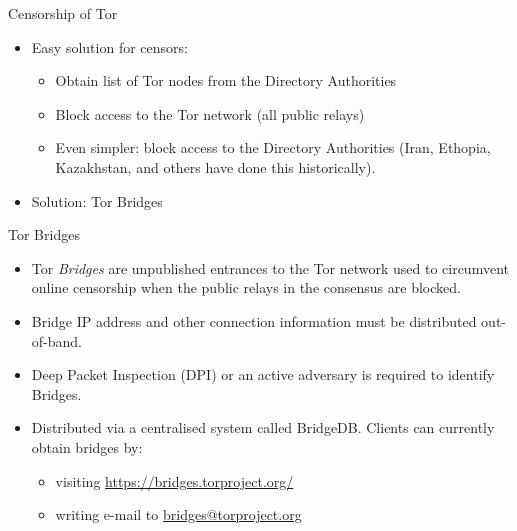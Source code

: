 \documentclass[9pt,a4paper]{beamer}
\begin{document}
\begin{frame}{Censorship of Tor}
  \begin{itemize}
    \item Easy solution for censors: 
      \begin{itemize}
        \item<2-> Obtain list of Tor nodes from the Directory Authorities
        \item<3-> Block access to the Tor network (all public relays)
        \item<4-> Even simpler: block access to the Directory Authorities (Iran, Ethopia, Kazakhstan,
          and others have done this historically).
      \end{itemize}
    \item<5-> Solution: Tor Bridges
  \end{itemize}
\end{frame}


\begin{frame}{Tor Bridges}
  \begin{itemize}
    \item<1-> Tor \emph{Bridges} are unpublished entrances to the Tor network used to circumvent
      online censorship when the public relays in the consensus are blocked.
    \item<2-> Bridge IP address and other connection information must be distributed out-of-band.
    \item<3-> Deep Packet Inspection (DPI) or an active adversary is required to identify Bridges.
    \item<4-> Distributed via a centralised system called BridgeDB. Clients can currently obtain
      bridges by:
      \begin{itemize}
        \item visiting \url{https://bridges.torproject.org/}
        \item writing e-mail to \href{mailto:bridges@torproject.org}{bridges@torproject.org}
      \end{itemize}
  \end{itemize}

\end{frame}
\end{document}
